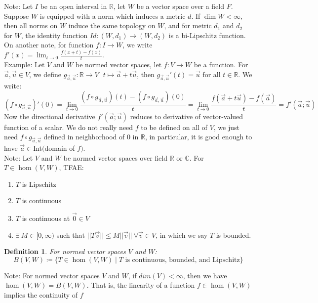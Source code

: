 \documentclass[11pt,oneside]{book}
\theoremstyle{break}
\theoremstyle{break}
\newtheorem{defn}{Definition}[corL]
\newcommand{\R}{\mathbb{R}}
\newcommand{\Complex}{\mathbb{C}}
\newcommand{\note}{\color{red}Note: \color{black}}
\newcommand{\example}{\color{green}Example: \color{black}}
\begin{document}
\note
Let $I$ be an open interval in $\R$, let $W$ be a vector space over a field $F$. Suppose $W$ is equipped with a norm which induces a metric $d$. If $\dim W < \infty$, then all norms on $W$ induce the same topology on $W$, and for metric $d_1$ and $d_2$ for $W$, the identity function $Id:(W,d_1)\to (W,d_2)$ is a bi-Lipschitz function. On another note, for function $f:I \to W$, we write $f'(x)= \lim_{t\to 0} \frac{f(x+t)-f(x)}{t}$.\\

\example Let $V$ and $W$ be normed vector spaces, let $f:V \to W$ be a function. For $\vec{a},\vec{u} \in V$, we define $g_{\vec{a},\vec{u}}:\R \to V \ \ \ t\mapsto \vec{a}+t\vec{u}$, then $g_{\vec{a},\vec{u}}'(t) = \vec{u}$ for all $t \in \R$. We write: $$(f \circ g_{\vec{a},\vec{u}})'(0)=\lim_{t\to 0}\frac{(f\circ g_{\vec{a},\vec{u}})(t)-(f\circ g_{\vec{a},\vec{u}})(0)}{t} = \lim_{t\to 0} \frac{ f(\vec{a}+t\vec{u})-f(\vec{a})}{t} = f'(\vec{a};\vec{u})$$ Now the directional derivative $f'(\vec{a};\vec{u})$ reduces to derivative of vector-valued function of a scalar. We do not really need $f$ to be defined on all of $V$, we just need $f\circ g_{\vec{a},\vec{u}}$ defined in neighborhood of $0$ in $\R$, in particular, it is good enough to have $\vec{a} \in $Int$($domain of $f)$. \\

\newpage
\note Let $V$ and $W$ be normed vector spaces over field $\R$ or $\Complex$. For $T \in \hom(V,W)$, TFAE:
\begin{enumerate}[topsep=3pt,itemsep=-1ex,partopsep=1ex,parsep=1ex]
\item  $T$ is Lipschitz
\item  $T$ is continuous
\item  $T$ is continuous at $\vec{0}\in V$
\item  $\exists\ M \in [0,\infty)$ such that $||T\vec{v}|| \leq M||\vec{v}||\ \forall \vec{v}\in V$, in which we say $T$ is bounded.
\end{enumerate}

\begin{defn}
For normed vector spaces $V$ and $W$: $$B(V,W) \coloneqq \{ T \in \hom(V,W)\mid T \text{ is continuous, bounded, and Lipschitz}\}$$
\end{defn}

\note For normed vector spaces $V$ and $W$, if $dim(V)<\infty$, then we have $\hom(V,W)= B(V,W)$. That is, the linearity of a function $f \in \hom(V,W)$ implies the continuity of $f$\\
\end{document}

